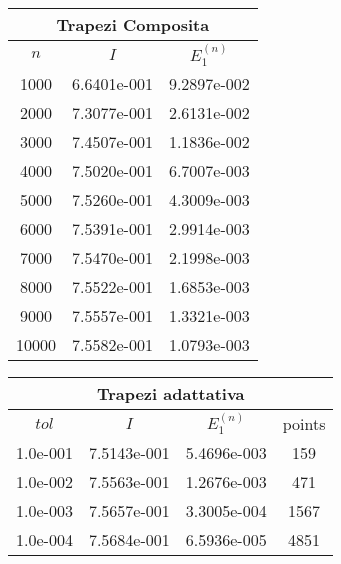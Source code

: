 			\begin{center}\begin{tabular}{c|c|c}
			\hline\multicolumn{3}{c}{Trapezi Composita}\\\hline
			$n$ & $I$ & $E_1^{(n)}$\\\hline
			1000&6.6401e-001&9.2897e-002\\
			2000&7.3077e-001&2.6131e-002\\
			3000&7.4507e-001&1.1836e-002\\
			4000&7.5020e-001&6.7007e-003\\
			5000&7.5260e-001&4.3009e-003\\
			6000&7.5391e-001&2.9914e-003\\
			7000&7.5470e-001&2.1998e-003\\
			8000&7.5522e-001&1.6853e-003\\
			9000&7.5557e-001&1.3321e-003\\
			10000&7.5582e-001&1.0793e-003
			\end{tabular}\end{center}
			\begin{center}
			\begin{tabular}{c|c|c|c}
			\hline\multicolumn{4}{c}{Trapezi adattativa}\\\hline
			$tol$ & $I$ & $E_1^{(n)}$ & points\\\hline
				1.0e-001&7.5143e-001&5.4696e-003&159\\
				1.0e-002&7.5563e-001&1.2676e-003&471\\
				1.0e-003&7.5657e-001&3.3005e-004&1567\\
				1.0e-004&7.5684e-001&6.5936e-005&4851
			\end{tabular}\end{center}


